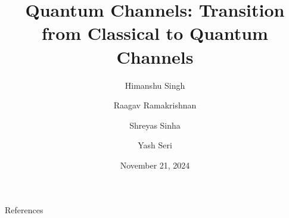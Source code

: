 \documentclass[9pt]{beamer}
\title{Quantum Channels: Transition from Classical to Quantum Channels}
\author{Himanshu Singh \and Raagav Ramakrishnan \and Shreyas Sinha \and Yash Seri}
\date{November 21, 2024}
\newcommand{\pageauthor}{}
\begin{document}
\begin{frame}
    \titlepage
\end{frame}

\begin{frame}
    \tableofcontents
\end{frame}

\renewcommand{\pageauthor}{Shreyas Sinha}


\renewcommand{\pageauthor}{Yash Seri}



\renewcommand{\pageauthor}{Raagav Ramakrishnan}



\renewcommand{\pageauthor}{Himanshu Singh}



\renewcommand{\pageauthor}{Shreyas Sinha}



\renewcommand{\pageauthor}{}
\begin{frame}{References}
   \printbibliography[heading=none]
\end{frame}
\end{document}
